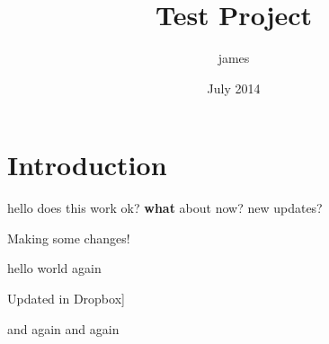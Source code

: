 \documentclass{article}
\title{Test Project}
\author{james }
\date{July 2014}
\begin{document}
\maketitle

\section{Introduction}

hello does this work ok? \textbf{what} about now? new updates?

Making some changes!

hello world again

Updated in Dropbox]

and again and again
\end{document}
